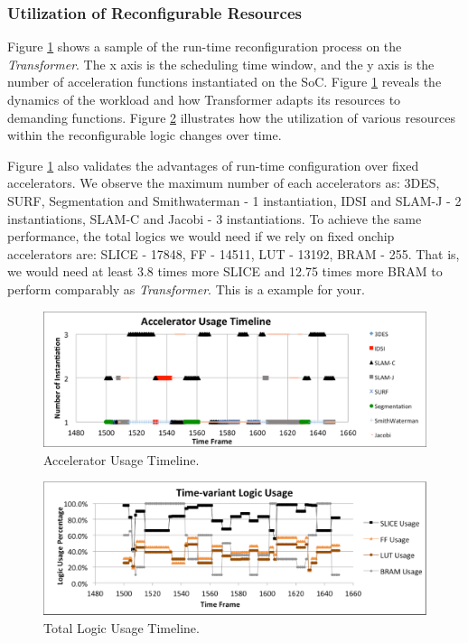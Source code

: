 \subsubsection{Utilization of Reconfigurable Resources}

Figure \ref{fig_acc_timeline} shows a sample of the run-time
reconfiguration process on the {\em Transformer}. The x axis is the
scheduling time window, and the y axis is the number of acceleration
functions instantiated on the SoC. Figure \ref{fig_acc_timeline}
reveals the dynamics of the workload and how {Transformer} adapts its
resources to demanding functions. Figure \ref{fig_logic_timeline}
illustrates how the utilization of various resources within the
reconfigurable logic changes over time.

Figure \ref{fig_acc_timeline}  also validates the advantages of run-time
configuration over fixed accelerators. We observe the maximum number of each
accelerators as: 3DES, SURF, Segmentation and Smithwaterman - 1
instantiation, IDSI and SLAM-J - 2 instantiations, SLAM-C and Jacobi -
3 instantiations. To achieve the same performance, the total logics we
would need if we rely on fixed onchip accelerators are: SLICE - 17848, FF
- 14511, LUT - 13192, BRAM - 255. That is, we would need at least 3.8 times
more SLICE and 12.75 times more BRAM to perform comparably as {\em Transformer}. 
This is a example for your.


\begin{figure}[ht]
    \centering
    \includegraphics[width=6.0in]{Acc_timeline}
    \caption{Accelerator Usage Timeline.}
    \label{fig_acc_timeline}
\end{figure}

\begin{figure}[ht]
    \centering
    \includegraphics[width=6.0in]{Logic-Usage-Timeline}
    \caption{Total Logic Usage Timeline.}
    \label{fig_logic_timeline}
\end{figure}
